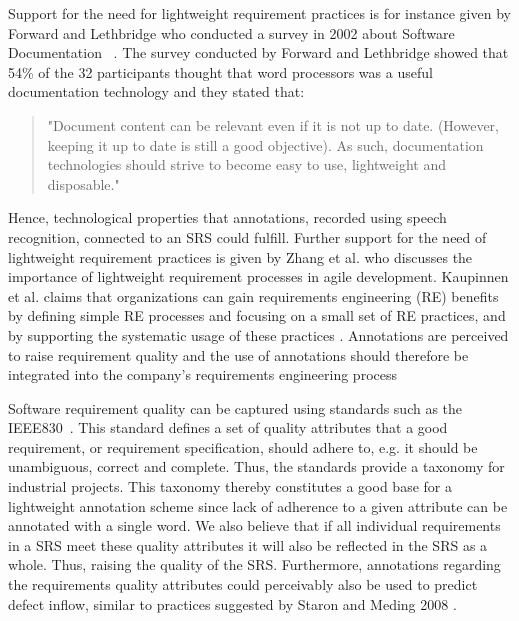 \documentclass[conference]{IEEEtran}
\begin{document}
Support for the need for lightweight requirement practices is for instance given by Forward and Lethbridge who conducted a survey in 2002 about Software Documentation ~\cite{forward2002}.
The survey conducted by Forward and Lethbridge showed that 54\% of the 32 participants thought that word processors was a useful documentation technology and they stated that:
\begin{quotation}
"Document content can be relevant even if it is not up to date. 
(However, keeping it up to date is still a good objective). 
As such, documentation technologies should strive to become easy to use, lightweight and disposable." \cite{forward2002}
\end{quotation}
Hence, technological properties that annotations, recorded using speech recognition, connected to an SRS could fulfill.
Further support for the need of lightweight requirement practices is given by Zhang et al. \cite{zhang2010towards} who discusses the importance of lightweight requirement processes in agile development. 
Kaupinnen et al. claims that organizations can gain requirements engineering (RE) benefits by defining simple RE processes and focusing on a small set of RE practices, and by supporting the systematic usage of these practices \cite{kauppinen2004implementing}. Annotations are perceived to raise requirement quality and the use of annotations should therefore be integrated into the company's requirements engineering process


Software requirement quality can be captured using standards such as the IEEE830~\cite{IEEE830}.
This standard defines a set of quality attributes that a good requirement, or requirement specification, should adhere to, e.g. it should be unambiguous, correct and complete.
Thus, the standards provide a taxonomy for industrial projects.
This taxonomy thereby constitutes a good base for a lightweight annotation scheme since lack of adherence to a given attribute can be annotated with a single word. 
We also believe that if all individual requirements in a SRS meet these quality attributes it will also be reflected in the SRS as a whole.
Thus, raising the quality of the SRS. 
Furthermore, annotations regarding the requirements quality attributes could perceivably also be used to predict defect inflow, similar to practices suggested by Staron and Meding 2008 \cite{mstaronmetrics}.
\end{document}

